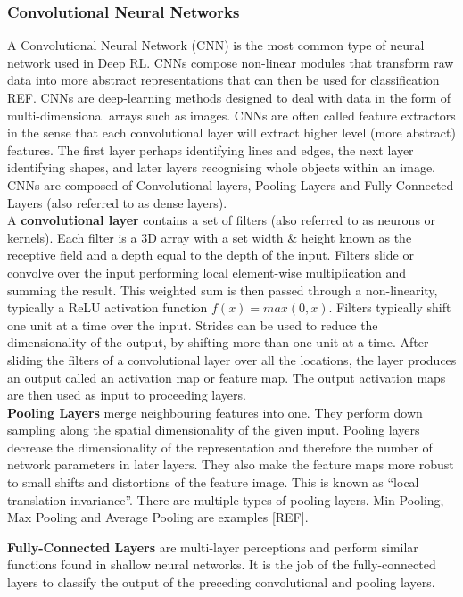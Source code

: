 \documentclass[10pt,journal,compsoc]{IEEEtran}
\begin{document}
\subsubsection{Convolutional Neural Networks}
A Convolutional Neural Network (CNN) is the most common type of neural network used in Deep RL. CNNs compose non-linear modules that transform raw data into more abstract representations that can then be used for classification REF. CNNs are deep-learning methods designed to deal with data in the form of multi-dimensional arrays such as images. CNNs are often called feature extractors in the sense that each convolutional layer will extract higher level (more abstract) features. The first layer perhaps identifying lines and edges, the next layer identifying shapes, and later layers recognising whole objects within an image. 
\\
CNNs are composed of Convolutional layers, Pooling Layers and Fully-Connected Layers (also referred to as dense layers). 
\\
A \textbf{convolutional layer} contains a set of filters (also referred to as neurons or kernels). Each filter is a 3D array with a set width \& height known as the receptive field and a depth equal to the depth of the input. Filters slide or convolve over the input performing local element-wise multiplication and summing the result. This weighted sum is then passed through a non-linearity, typically a ReLU activation function \begin{math}f(x) = max(0,x)\end{math}.  Filters typically shift one unit at a time over the input. Strides can be used to reduce the dimensionality of the output, by shifting more than one unit at a time. After sliding the filters of a convolutional layer over all the locations, the layer produces an output called an activation map or feature map. The output activation maps are then used as input to proceeding layers.
\\
\textbf{Pooling Layers} merge neighbouring features into one. They perform down sampling along the spatial dimensionality of the given input. Pooling layers decrease the dimensionality of the representation and therefore the number of network parameters in later layers. They also make the feature maps more robust to small shifts and distortions of the feature image. This is known as “local translation invariance”. There are multiple types of pooling layers. Min Pooling, Max Pooling and Average Pooling are examples [REF].

\textbf{Fully-Connected Layers} are multi-layer perceptions and perform similar functions found in shallow neural networks. It is the job of the fully-connected layers to classify the output of the preceding convolutional and pooling layers.
\end{document}
